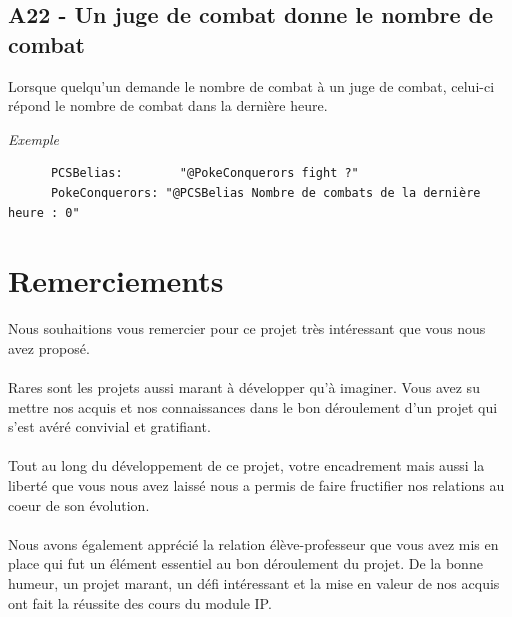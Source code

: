 \documentclass[12pt]{article}
\begin{document}
{{\subsection{A22 - Un juge de combat donne le nombre de combat}

Lorsque quelqu'un demande le nombre de combat à un juge de combat, celui-ci répond le nombre de combat dans la dernière heure.\\

{\noindent \textit{Exemple}
\begin{verbatim}
      PCSBelias: 	    "@PokeConquerors fight ?"
      PokeConquerors: "@PCSBelias Nombre de combats de la dernière heure : 0"
\end{verbatim}

\newpage
\section{Remerciements}

Nous souhaitions vous remercier pour ce projet très intéressant que vous nous avez proposé. \\\\Rares sont les projets aussi marant à développer qu'à imaginer. Vous avez su mettre nos acquis et nos connaissances dans le bon déroulement d'un projet qui s'est avéré convivial et gratifiant.\\\\ Tout au long du développement de ce projet, votre encadrement mais aussi la liberté que vous nous avez laissé nous a permis de faire fructifier nos relations au coeur de son évolution.\\\\Nous avons également apprécié la relation élève-professeur que vous avez mis en place qui fut un élément essentiel au bon déroulement du projet. De la bonne humeur, un projet marant, un défi intéressant et la mise en valeur de nos acquis ont fait la réussite des cours du module IP.

\newpage
}}}
\end{document}
